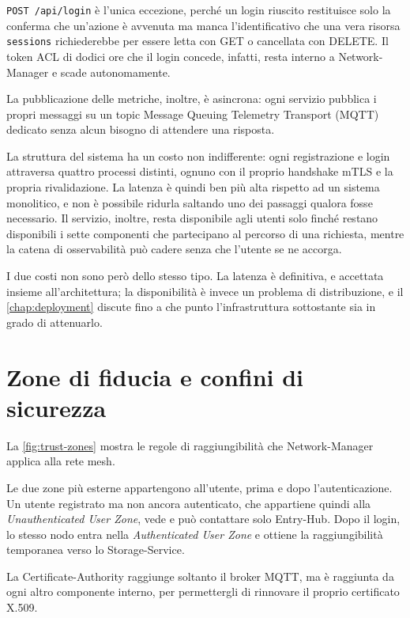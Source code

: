 \texttt{POST /api/login} è l'unica eccezione, perché un login riuscito restituisce solo la conferma che 
un'azione è avvenuta ma manca l'identificativo che una vera risorsa \texttt{sessions} richiederebbe per 
essere letta con GET o cancellata con DELETE. Il token ACL di dodici ore che il login concede, infatti, resta 
interno a Network-Manager e scade autonomamente.

La pubblicazione delle metriche, inoltre, è asincrona: ogni servizio pubblica i propri messaggi su
un topic Message Queuing Telemetry Transport (MQTT) dedicato senza alcun bisogno di attendere una risposta.

La struttura del sistema ha un costo non indifferente: ogni registrazione e login attraversa
quattro processi distinti, ognuno con il proprio handshake mTLS e la propria rivalidazione. 
La latenza è quindi ben più alta rispetto ad un sistema monolitico, e non è possibile ridurla saltando uno 
dei passaggi qualora fosse necessario. Il servizio, inoltre, resta disponibile agli utenti solo finché 
restano disponibili i sette componenti che partecipano al percorso di una richiesta, mentre la catena di 
osservabilità può cadere senza che l'utente se ne accorga.

I due costi non sono però dello stesso tipo. La latenza è definitiva, e accettata insieme
all'architettura; la disponibilità è invece un problema di distribuzione, e il
\autoref{chap:deployment} discute fino a che punto l'infrastruttura sottostante sia in grado di attenuarlo.

\section{Zone di fiducia e confini di sicurezza}
\label{sec:trust-zones}

La \autoref{fig:trust-zones} mostra le regole di raggiungibilità che Network-Manager applica alla rete mesh.

Le due zone più esterne appartengono all'utente, prima e dopo l'autenticazione. Un utente registrato ma
non ancora autenticato, che appartiene quindi alla \emph{Unauthenticated User Zone}, vede e può contattare 
solo Entry-Hub. Dopo il login, lo stesso nodo entra nella \emph{Authenticated User Zone} e ottiene la 
raggiungibilità temporanea verso lo Storage-Service.

La Certificate-Authority raggiunge soltanto il broker MQTT, ma è raggiunta da ogni altro
componente interno, per permettergli di rinnovare il proprio certificato X.509.

